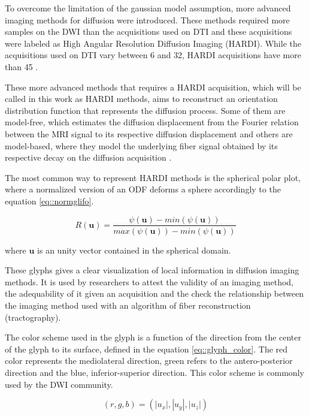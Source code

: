 \documentclass[twoside,twocolumn,10pt]{article}
\begin{document}
To overcome the limitation of the gaussian model assumption, more advanced imaging methods for diffusion were introduced. These methods required more samples on the DWI than the acquisitions used on DTI and these acquisitions were labeled as High Angular Resolution Diffusion Imaging (HARDI). While the acquisitions used on DTI vary between 6 and 32, HARDI acquisitions have more than 45 \cite{descoteaux2015}.

These more advanced methods that requires a HARDI acquisition, which will be called in this work as HARDI methods, aims to reconstruct an orientation distribution function that represents the diffusion process. Some of them are model-free, which estimates the diffusion displacement from the Fourier relation between the MRI signal to its respective diffusion displacement \cite{wedeen2005, TuchQBall2004, yeh2010} and others are model-based, where they model the underlying fiber signal obtained by its respective decay on the diffusion acquisition \cite{tournier2007, tournier2007}.

The most common way to represent HARDI methods is the spherical polar plot, where a normalized version of an ODF deforms a sphere accordingly to the equation \ref{eq::normglifo}. 

\begin{equation}
\label{eq::normglifo}
    R(\bm{u}) = \frac{\psi(\bm{u}) - min(\psi(\bm{u}))}{max(\psi(\bm{u})) - min(\psi(\bm{u}))}
\end{equation}

where $\bm{u}$ is an unity vector contained in the spherical domain.

These glyphs gives a clear visualization of local information in diffusion imaging methods. It is used by researchers to attest the validity of an imaging method, the adequability of it given an acquisition and the check the relationship between the imaging method used with an algorithm of fiber reconstruction (tractography).

The color scheme used in the glyph is a function of the direction from the center of the glyph to its surface, defined in the equation \ref{eq::glyph_color}. The red color represents the mediolateral direction, green refers to the antero-posterior direction and the blue, inferior-superior direction. This color scheme is commonly used by the DWI community.


\begin{equation}
\label{eq::glyph_color}
    (r,g,b) = (|u_x|,|u_y|,|u_z|)
\end{equation}
\end{document}
